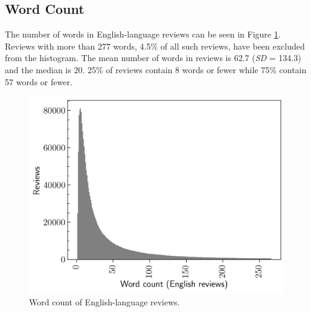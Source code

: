 
\subsection{Word Count} \label{sec:Dataset_RT_Words}

The number of words in English-language reviews can be seen in Figure \ref{fig:Dataset_HistWordsEng}. Reviews with more than 277 words, 4.5\% of all such reviews, have been excluded from the histogram. The mean number of words in reviews is 62.7 (\textit{SD} = 134.3) and the median is 20. 25\% of reviews contain 8 words or fewer while 75\% contain 57 words or fewer.

\begin{figure}[ht]
    \centering
    \includegraphics[scale=0.55]{figures/03_dataset/14_hist_review_words_en.png}
    \caption{Word count of English-language reviews.}
    \label{fig:Dataset_HistWordsEng}
\end{figure}
